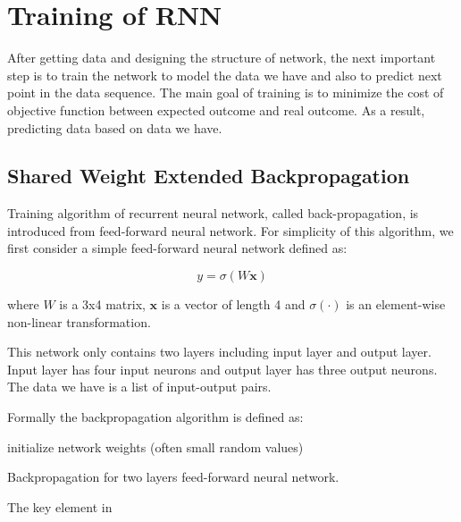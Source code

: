 \documentclass[officiallayout]{tktla}
\begin{document}
\section{Training of RNN}\label{training_rnn}
After getting data and designing the structure of network, the next important step is to train the network to model the data we have and also to predict next point in the data sequence. The main goal of training is to minimize the cost of objective function between expected outcome and real outcome. As a result, predicting data based on data we have.

\subsection{Shared Weight Extended Backpropagation}

Training algorithm of recurrent neural network, called back-propagation, is introduced from feed-forward neural network. For simplicity of this algorithm, we first consider a simple feed-forward neural network defined as:

\begin{equation}
y = \sigma(W\mathbf{x})
\end{equation}

where $W$ is a 3x4 matrix, $\mathbf{x}$ is a vector of length 4 and $\sigma(\cdot)$ is an element-wise non-linear transformation.

This network only contains two layers including input layer and output layer. Input layer has four input neurons and output layer has three output neurons. The data we have is a list of input-output pairs.

Formally the backpropagation algorithm is defined as:

\begin{algorithm}
 initialize network weights (often small random values)\;
 \caption{Backpropagation for two layers feed-forward neural network.}\label{backpropagation}
\end{algorithm}

The key element in 
\end{document}
